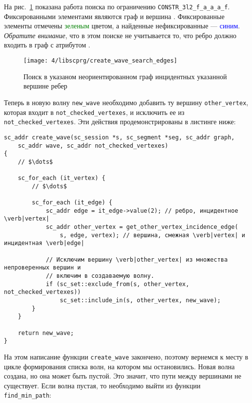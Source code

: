 На рис.~\ref{fig:create_wave_search_edges} показана работа поиска по
ограничению \lstinline|CONSTR_3l2_f_a_a_a_f|. Фиксированными
элементами являются граф  и вершина . Фиксированные
элементы отмечены \textcolor{green}{зеленым} цветом, а найденные
нефиксированные --- \textcolor{blue}{синим}. \emph{Обратите внимание},
что в этом поиске не учитывается то, что ребро должно входить в граф с
атрибутом .

\begin{figure}[h!]
  \centering
  \texttt{[image: 4/libscprg/create\_wave\_search\_edges]}
  \caption{Поиск в указаном неориентированном граф инцидентных указанной вершине ребер}
  \label{fig:create_wave_search_edges}
\end{figure}

Теперь в новую волну \lstinline|new_wave| необходимо добавить ту
вершину \lstinline|other_vertex|, которая входит в
\lstinline|not_checked_vertexes|, и исключить ее из
\lstinline|not_checked_vertexes|. Эти действия продемонстрированы в
листинге ниже:

\begin{lstlisting}[texcl]
sc_addr create_wave(sc_session *s, sc_segment *seg, sc_addr graph,
    sc_addr wave, sc_addr not_checked_vertexes)
{
    // $\dots$

    sc_for_each (it_vertex) {
        // $\dots$

        sc_for_each (it_edge) {
            sc_addr edge = it_edge->value(2); // ребро, инцидентное  \verb|vertex|
            sc_addr other_vertex = get_other_vertex_incidence_edge(
                s, edge, vertex); // вершина, смежная \verb|vertex| и инцидентная \verb|edge|

            // Исключим вершину \verb|other_vertex| из множества непроверенных вершин и
            // включим в создаваемую волну.
            if (sc_set::exclude_from(s, other_vertex, not_checked_vertexes))
                sc_set::include_in(s, other_vertex, new_wave);
        }
    }

    return new_wave;
}
\end{lstlisting}

На этом написание функции \lstinline|create_wave| закончено, поэтому
вернемся к месту в цикле формирования списка волн, на котором мы
остановились. Новая волна создана, но она может быть пустой. Это
значит, что пути между вершинами не существует. Если волна пустая, то
необходимо выйти из функции \lstinline|find_min_path|:


